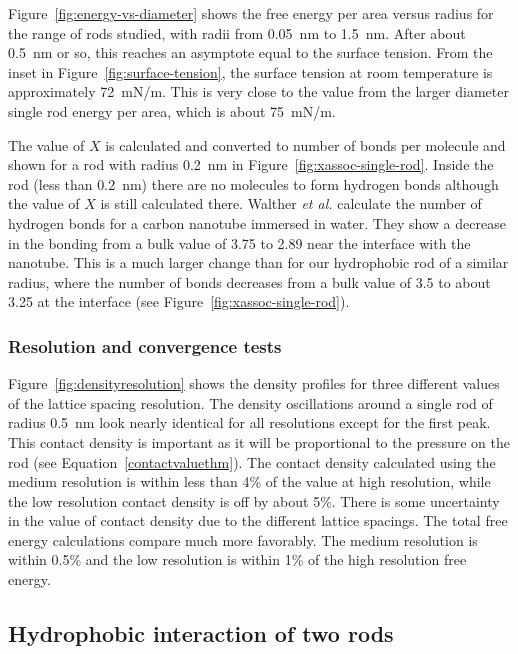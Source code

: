 \documentclass[letterpaper,twocolumn,amsmath,amssymb,prb]{revtex4-1}
\begin{document}
Figure~\ref{fig:energy-vs-diameter} shows the free energy per area versus
radius for the range of rods studied, with radii from 0.05~nm to 1.5~nm. After 
about 0.5~nm or so, this reaches
an asymptote equal to the surface tension. From the inset in Figure~\ref{fig:surface-tension}, the surface tension at room 
temperature is approximately 72~mN/m. This is very close to the value from
the larger diameter single rod energy per area, which is about 75~mN/m. 

The value of $X$ is calculated and converted to number of bonds per molecule and 
shown for a rod with radius 0.2~nm in Figure~\ref{fig:xassoc-single-rod}. Inside the
rod (less than 0.2~nm) there are no molecules to form hydrogen bonds although the value
of $X$ is still calculated there. Walther \emph{et al.}\cite{walther2001carbon} 
calculate the number of hydrogen bonds for a carbon nanotube immersed in water.
They show a decrease in the bonding from a bulk value of 3.75 to 2.89 near the 
interface with the nanotube. This is a much larger change than for our hydrophobic
rod of a similar radius, where the number of bonds decreases from a bulk value of 3.5 
to about 3.25 at the interface (see Figure~\ref{fig:xassoc-single-rod}).



\subsubsection{Resolution and convergence tests}
Figure~\ref{fig:densityresolution} shows the density profiles for three
different values of the lattice spacing resolution. The density oscillations
around a single rod of radius 0.5~nm look nearly identical for all resolutions
except for the first peak. This contact density is important as it will be
proportional to the pressure on the rod (see Equation~\ref{contactvaluethm}). The contact
density calculated using the medium resolution is within less than 4\% of the
value at high resolution, while the low resolution contact density is off by
about 5\%. There is some uncertainty in the value of contact density due to the
different lattice spacings. The total free energy calculations compare much more
favorably. The medium resolution is within 0.5\% and the low resolution is
within 1\% of the high resolution free energy.

\subsection{Hydrophobic interaction of two rods}
\end{document}
